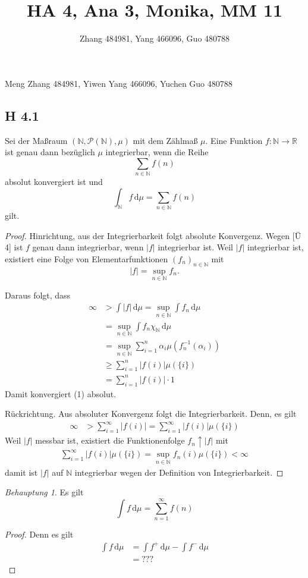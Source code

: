 \documentclass[draft,a5paper]{article}
\title{HA 4, Ana 3, Monika, MM 11}
\author{Zhang 484981, Yang 466096, Guo 480788}
\providecommand{\abs}[1]{\left\lvert#1\right\rvert}
\theoremstyle{remark}
\newtheorem*{Behauptung}{Behauptung}
\newcommand{\dd}{\,\mathrm{d}}
\begin{document}
\maketitle
\begin{center}
  Meng Zhang 484981, Yiwen Yang 466096, Yuchen Guo 480788
\end{center}
\subsection{H 4.1}
Sei der Maßraum \((\mathbb{N}, \mathcal{P}(\mathbb{N}), \mu)\) mit dem Zählmaß \(\mu\).  Eine Funktion \(f\colon
\mathbb{N} \to \mathbb{R}\) ist genau dann bezüglich \(\mu\) integrierbar, wenn die Reihe
\[ \sum_{n \in \mathbb{N}}{f(n)} \tag{1} \]
absolut konvergiert ist und
\[ \int_{\mathbb{N}}{f \dd \mu} = \sum_{n \in \mathbb{N}}{f(n)} \tag{2}\]
gilt.
\begin{proof}
  Hinrichtung, aus der Integrierbarkeit folgt absolute Konvergenz.
  Wegen [Ü 4] ist \(f\) genau dann integrierbar, wenn \(\abs{f}\)
  integrierbar ist.  Weil \(\abs{f}\) integrierbar ist, existiert eine
  Folge von Elementarfunktionen \((f_{n})_{n \in \mathbb{N}}\) mit
  \[\abs{f} = \sup_{n \in \mathbb{N}} f_{n}.\]

  Daraus folgt,  dass
  \begin{align*}
    \infty &> \int{\abs{f}\dd\mu} = \sup_{n \in \mathbb{N}} \int f_{n} \dd \mu \\
      &= \sup_{n \in \mathbb{N}} \int f_{n} \chi_{\mathbb{N}} \dd \mu \\
      &= \sup_{n \in \mathbb{N}} \sum_{i=1}^{n} \alpha_{i} \mu(f_{n}^{-1}(\alpha_{i})) \\
      &\ge \sum_{i=1}^{n}\abs{f(i)}\mu(\{i\}) \\
    &= \sum_{i=1}^{n}\abs{f(i)} \cdot 1
  \end{align*}
  Damit konvergiert (1) absolut.

  Rückrichtung. Aus absoluter Konvergenz folgt die Integrierbarkeit.
  Denn, es gilt
  \begin{align*}
    \infty &> \sum_{i = 1}^{\infty}{\abs{f(i)}} = \sum_{i=1}^{\infty}{\abs{f(i)} \mu(\{i\})}
  \end{align*}
  Weil \(\abs{f}\) messbar ist, existiert die Funktionenfolge \(f_{n} \uparrow
  \abs{f}\) mit
  \begin{align*}
    \sum_{i=1}^{\infty}{\abs{f(i)} \mu(\{i\})} = \sup_{n \in \mathbb{N}}{f_{n}(i) \mu(\{i\})}
    < \infty
  \end{align*}
  damit ist \(\abs{f}\) auf \(\mathbb{N}\) integrierbar wegen der Definition von
  Integrierbarkeit.
\end{proof}
\begin{Behauptung}
  Es gilt
  \[\int f \dd \mu = \sum_{n=1}^{\infty}f(n)\]
\end{Behauptung}
\begin{proof}
  Denn es gilt
  \begin{align*}
    \int f \dd \mu &= \int f^{+} \dd \mu - \int f^{-} \dd \mu \\
              &= ???
  \end{align*}
\end{proof}
\end{document}
